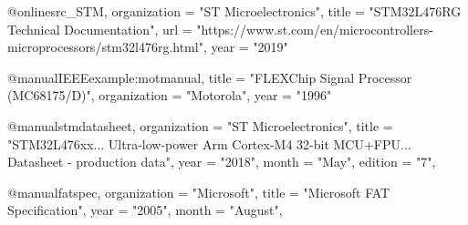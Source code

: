 @online{src_STM,
  organization  = "ST Microelectronics",
  title         = "STM32L476RG Technical Documentation",
  url           = "https://www.st.com/en/microcontrollers-microprocessors/stm32l476rg.html",
  year          = "2019"
}


@manual{IEEEexample:motmanual,
  title         = "{FLEXChip} Signal Processor ({MC68175/D})",
  organization  = "Motorola",
  year          = "1996"
}

@manual{stmdatasheet,
    organization  = "ST Microelectronics",
    title   = "STM32L476xx... Ultra-low-power Arm Cortex-M4 32-bit MCU+FPU... Datasheet - production data",
    year    = "2018",
    month   = "May",
    edition  = "7",
}

@manual{fatspec,
    organization  = "Microsoft",
    title   = "Microsoft FAT Specification",
    year    = "2005",
    month   = "August",
}
\fi